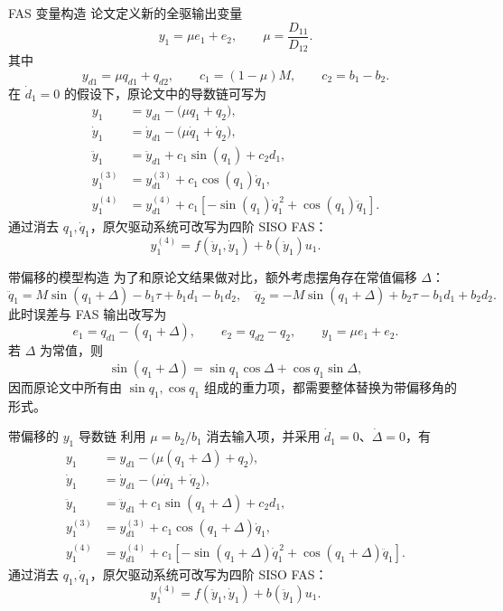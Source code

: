 \begin{frame}{FAS 变量构造}
    \scriptsize
    论文定义新的全驱输出变量
    \[
    y_1 = \mu e_1 + e_2,
    \qquad
    \mu = \frac{D_{11}}{D_{12}}.
    \]
    其中
    \[
    y_{d1} = \mu q_{d1} + q_{d2},
    \qquad
    c_1 = (1-\mu)M,
    \qquad
    c_2 = b_1 - b_2.
    \]
    在 $\dot d_1 = 0$ 的假设下，原论文中的导数链可写为
    \[
    \begin{aligned}
    y_1 &= y_{d1} - \bigl(\mu q_1+q_2\bigr), \\
    \dot y_1 &= \dot y_{d1} - \bigl(\mu \dot q_1+\dot q_2\bigr), \\
    \ddot y_1 &= \ddot y_{d1} + c_1 \sin(q_1) + c_2 d_1, \\
    y_1^{(3)} &= y_{d1}^{(3)} + c_1 \cos(q_1)\dot q_1, \\
    y_1^{(4)} &= y_{d1}^{(4)} + c_1\!\left[
    -\sin(q_1)\dot q_1^{\,2}
    + \cos(q_1)\ddot q_1 \right].
    \end{aligned}
    \]
    通过消去 $q_1,\dot q_1$，原欠驱动系统可改写为四阶 SISO FAS：
    \[
    y_1^{(4)} = f(\ddot y_1,\dot y_1) + b(\ddot y_1)u_1.
    \]
\end{frame}

\begin{frame}{带偏移的模型构造}
    \scriptsize
    为了和原论文结果做对比，额外考虑摆角存在常值偏移 $\Delta$：
    \[
    \ddot q_1 = M\sin(q_1+\Delta)-b_1\tau+b_1d_1-b_1d_2,
    \quad
    \ddot q_2 = -M\sin(q_1+\Delta)+b_2\tau-b_1d_1+b_2d_2.
    \]
    此时误差与 FAS 输出改写为
    \[
    e_1 = q_{d1}-(q_1+\Delta),
    \qquad
    e_2 = q_{d2}-q_2,
    \qquad
    y_1 = \mu e_1 + e_2.
    \]
    若 $\Delta$ 为常值，则
    \[
    \sin(q_1+\Delta)=\sin q_1\cos\Delta+\cos q_1\sin\Delta,
    \]
    因而原论文中所有由 $\sin q_1,\cos q_1$ 组成的重力项，都需要整体替换为带偏移角的形式。
\end{frame}

\begin{frame}{带偏移的 $y_1$ 导数链}
    \scriptsize
    利用 $\mu=b_2/b_1$ 消去输入项，并采用 $\dot d_1=0$、$\dot\Delta=0$，有
    \[
    \begin{aligned}
    y_1 &= y_{d1} - \bigl(\mu(q_1+\Delta)+q_2\bigr), \\
    \dot y_1 &= \dot y_{d1} - \bigl(\mu \dot q_1+\dot q_2\bigr), \\
    \ddot y_1 &= \ddot y_{d1} + c_1 \sin(q_1+\Delta) + c_2 d_1, \\
    y_1^{(3)} &= y_{d1}^{(3)} + c_1 \cos(q_1+\Delta)\dot q_1, \\
    y_1^{(4)} &= y_{d1}^{(4)} + c_1\!\left[
    -\sin(q_1+\Delta)\dot q_1^{\,2}
    + \cos(q_1+\Delta)\ddot q_1 \right].
    \end{aligned}
    \]
    通过消去 $q_1,\dot q_1$，原欠驱动系统可改写为四阶 SISO FAS：
    \[
    y_1^{(4)} = f(\ddot y_1,\dot y_1) + b(\ddot y_1)u_1.
    \]
\end{frame}

